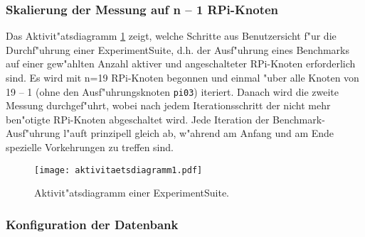 \subsubsection{Skalierung der Messung auf n -- 1 RPi-Knoten} 

Das Aktivit"atsdiagramm \ref{fig:Aktivitaetsdiagramm} zeigt, welche Schritte aus Benutzersicht f"ur die Durchf"uhr\-ung einer ExperimentSuite, d.h. der Ausf"uhrung eines Benchmarks auf einer gew"ahlten Anzahl aktiver und angeschalteter RPi-Knoten erforderlich sind. Es wird mit n=19 RPi-Knoten begonnen und einmal "uber alle Knoten von 19 -- 1 (ohne den Ausf"uhrungsknoten \texttt{pi03}) iteriert. Danach wird die zweite Messung durchgef"uhrt, wobei nach jedem Iterationsschritt der nicht mehr ben"otigte RPi-Knoten abgeschaltet wird. Jede Iteration der Benchmark-Ausf"uhrung l"auft prinzipell gleich ab, w"ahrend am Anfang und am Ende spezielle Vorkehrungen zu treffen sind. 
\begin{figure}[htb]
  \centerline{\texttt{[image: aktivitaetsdiagramm1.pdf]}} 
  \caption{Aktivit"atsdiagramm einer ExperimentSuite.}
  \label{fig:Aktivitaetsdiagramm}
\end{figure}

\subsubsection{Konfiguration der Datenbank}

